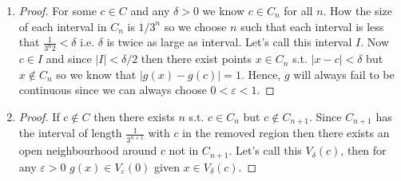 \begin{enumerate}[label=(\alph*)]
    \item 
    \begin{proof}
        For some $c\in C$ and any $\delta>0$ we know $c\in C_n$ for all $n$.
        How the size of each interval in $C_n$ is $1/3^n$ so we choose $n$ such 
        that each interval is less that $\frac{1}{3^n 2} < \delta$ i.e. 
        $\delta$ is twice as large as interval. Let's call this interval $I$.
        Now $c\in I$ and since $|I|< \delta /2 $ then there exist points $x\in C_n$ 
        s.t. $|x-c|<\delta$ but $x\not\in C_n$ so we know 
        that $|g(x)-g(c)|=1$. Hence, $g$ will always fail to be continuous since
        we can always choose $0<\varepsilon < 1$.
    \end{proof}

    \item 
    \begin{proof}
        If $c\not\in C$ then there exists $n$ s.t. $c\in C_n$ but
        $c\not\in C_{n+1}$. Since $C_{n+1}$ has the interval of 
        length $\frac{1}{3^{n+1}}$ with $c$ in the removed region then 
        there exists an open neighbourhood around $c$ not in $C_{n+1}$.
        Let's call this $V_\delta(c)$, then for any $\varepsilon>0$ 
        $g(x)\in V_\varepsilon(0)$ given $x\in V_\delta(c)$.
    \end{proof}
\end{enumerate}